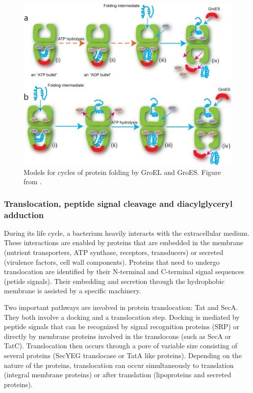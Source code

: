 \begin{figure}[!ht]
	\centering
	\includegraphics[width=0.8\linewidth]{figure/groESL}
	\caption{Models for cycles of protein folding by GroEL and GroES. Figure from \citet{lin_repetitive_2013}.}
	\label{fig:groESL}	
\end{figure}


\subsubsection{Translocation, peptide signal cleavage and diacylglyceryl adduction}

During its life cycle, a bacterium heavily interacts with the extracellular medium. These interactions are enabled by proteins that are embedded in the membrane (nutrient transporters, ATP synthase, receptors, transducers) or secreted (virulence factors, cell wall components). Proteins that need to undergo translocation are identified by their N-terminal and C-terminal signal sequences (petide signals). Their embedding and secretion through the hydrophobic membrane is assisted by a specific machinery. 

Two important pathways are involved in protein translocation: Tat and SecA. They both involve a docking and a translocation step. Docking is mediated by peptide signals that can be recognized by signal recognition proteins (SRP) or directly by membrane proteins involved in the translocons (such as SecA or TatC). Translocation then occurs through a pore of variable size consisting of several proteins (SecYEG translocase or TatA like proteins). Depending on the nature of the proteins, translocation can occur simultaneously to translation (integral membrane proteins) or after translation (lipoproteins and secreted proteins). 

